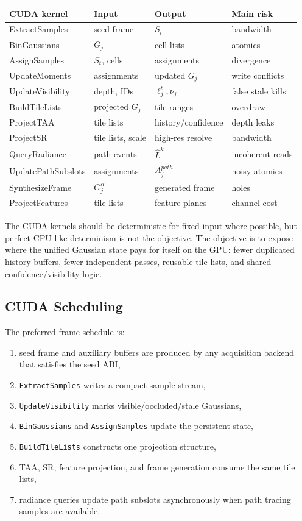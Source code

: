 \documentclass[11pt]{article}
\begin{document}
\begin{center}
\begin{tabular}{llll}
\toprule
CUDA kernel & Input & Output & Main risk \\
\midrule
ExtractSamples & seed frame & $S_t$ & bandwidth \\
BinGaussians & $G_j$ & cell lists & atomics \\
AssignSamples & $S_t$, cells & assignments & divergence \\
UpdateMoments & assignments & updated $G_j$ & write conflicts \\
UpdateVisibility & depth, IDs & $\ell_j^t,\nu_j$ & false stale kills \\
BuildTileLists & projected $G_j$ & tile ranges & overdraw \\
ProjectTAA & tile lists & history/confidence & depth leaks \\
ProjectSR & tile lists, scale & high-res resolve & bandwidth \\
QueryRadiance & path events & $\hat{L}^k$ & incoherent reads \\
UpdatePathSubslots & assignments & $A_j^{path}$ & noisy atomics \\
SynthesizeFrame & $G_j^\alpha$ & generated frame & holes \\
ProjectFeatures & tile lists & feature planes & channel cost \\
\bottomrule
\end{tabular}
\end{center}

The CUDA kernels should be deterministic for fixed input where possible, but
perfect CPU-like determinism is not the objective. The objective is to expose
where the unified Gaussian state pays for itself on the GPU: fewer duplicated
history buffers, fewer independent passes, reusable tile lists, and shared
confidence/visibility logic.

\subsection{CUDA Scheduling}

The preferred frame schedule is:

\begin{enumerate}
  \item seed frame and auxiliary buffers are produced by any acquisition
        backend that satisfies the seed ABI,
  \item \texttt{ExtractSamples} writes a compact sample stream,
  \item \texttt{UpdateVisibility} marks visible/occluded/stale Gaussians,
  \item \texttt{BinGaussians} and \texttt{AssignSamples} update the persistent
        state,
  \item \texttt{BuildTileLists} constructs one projection structure,
  \item TAA, SR, feature projection, and frame generation consume the same tile
        lists,
  \item radiance queries update path subslots asynchronously when path tracing
        samples are available.
\end{enumerate}
\end{document}
